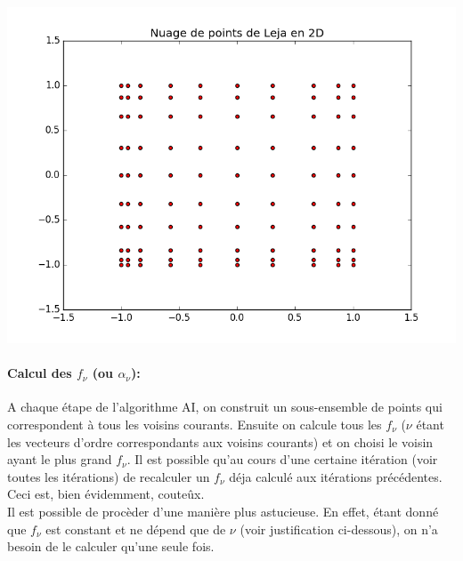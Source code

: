 \begin{center}
\includegraphics[height= 9 cm,width = \linewidth]{images/leja_sequence.png}
\end{center}

\paragraph{Calcul des $f_{\nu}$ (ou $\alpha_{\nu}$):\\}
\hspace{0.5cm} A chaque étape de l'algorithme AI, on construit un sous-ensemble de points qui correspondent à tous les voisins courants.
Ensuite on calcule tous les $f_{\nu}$ ($\nu$ étant les vecteurs d'ordre correspondants aux voisins courants)
et on choisi le voisin ayant le plus grand $f_{\nu}$. Il est possible qu'au cours d'une certaine itération (voir toutes les itérations)
de recalculer un $f_{\nu}$ déja calculé aux itérations précédentes. Ceci est, bien évidemment, couteûx. \\
Il est possible de procèder d'une manière plus astucieuse. En effet, étant donné que $f_{\nu}$ est constant et ne dépend que de $\nu$ (voir justification ci-dessous),
on n'a besoin de le calculer qu'une seule fois.

